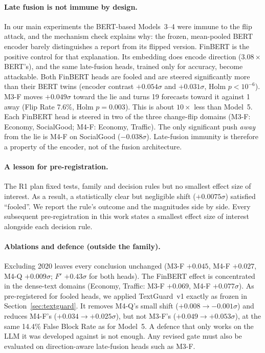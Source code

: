 \paragraph{Late fusion is not immune by design.}
In our main experiments the BERT-based Models~3--4 were immune to the flip attack, and the
mechanism check explains why: the frozen, mean-pooled BERT encoder barely distinguishes a report
from its flipped version. FinBERT is the positive control for that explanation. Its embedding
does encode direction ($3.08\times$ BERT's), and the same late-fusion heads, trained only for
accuracy, become attackable. Both FinBERT heads are fooled and are steered significantly more
than their BERT twins (encoder contrast $+0.054\sigma$ and $+0.031\sigma$, Holm $p<10^{-6}$).
M3-F moves $+0.049\sigma$ toward the lie and turns 19 forecasts toward it against 1 away (Flip
Rate 7.6\%, Holm $p=0.003$). This is about $10\times$ less than Model~5. Each FinBERT head is
steered in two of the three change-flip domains (M3-F: Economy, SocialGood; M4-F: Economy,
Traffic). The only significant push \emph{away} from the lie is M4-F on SocialGood
($-0.038\sigma$). Late-fusion immunity is therefore a property of the encoder, not of the fusion
architecture.

\paragraph{A lesson for pre-registration.}
The R1 plan fixed tests, family and decision rules but no smallest effect size of interest. As a
result, a statistically clear but negligible shift ($+0.0075\sigma$) satisfied ``fooled''. We
report the rule's outcome and the magnitudes side by side. Every subsequent pre-registration in
this work states a smallest effect size of interest alongside each decision rule.

\paragraph{Ablations and defence (outside the family).}
Excluding 2020 leaves every conclusion unchanged (M3-F $+0.045$, M4-F $+0.027$, M4-Q
$+0.009\sigma$; $F'$ $+0.43\sigma$ for both heads). The FinBERT effect is concentrated in the
dense-text domains (Economy, Traffic: M3-F $+0.069$, M4-F $+0.077\sigma$). As pre-registered for
fooled heads, we applied TextGuard~v1 exactly as frozen in Section~\ref{sec:textguard}. It
removes M4-Q's small shift ($+0.008\to-0.001\sigma$) and reduces M4-F's
($+0.034\to+0.025\sigma$), but not M3-F's ($+0.049\to+0.053\sigma$), at the same 14.4\% False
Block Rate as for Model~5. A defence that only works on the LLM it was developed against is not
enough. Any revised gate must also be evaluated on direction-aware late-fusion heads such as
M3-F.

